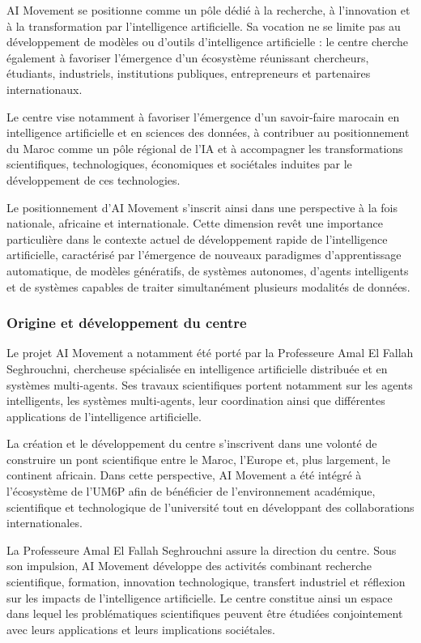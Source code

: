 \documentclass[12pt,a4paper]{report}
\begin{document}
AI Movement se positionne comme un pôle dédié à la recherche, à l'innovation et à la transformation par l'intelligence artificielle. Sa vocation ne se limite pas au développement de modèles ou d'outils d'intelligence artificielle : le centre cherche également à favoriser l'émergence d'un écosystème réunissant chercheurs, étudiants, industriels, institutions publiques, entrepreneurs et partenaires internationaux.

Le centre vise notamment à favoriser l'émergence d'un savoir-faire marocain en intelligence artificielle et en sciences des données, à contribuer au positionnement du Maroc comme un pôle régional de l'IA et à accompagner les transformations scientifiques, technologiques, économiques et sociétales induites par le développement de ces technologies.

Le positionnement d'AI Movement s'inscrit ainsi dans une perspective à la fois nationale, africaine et internationale. Cette dimension revêt une importance particulière dans le contexte actuel de développement rapide de l'intelligence artificielle, caractérisé par l'émergence de nouveaux paradigmes d'apprentissage automatique, de modèles génératifs, de systèmes autonomes, d'agents intelligents et de systèmes capables de traiter simultanément plusieurs modalités de données.

\subsubsection{Origine et développement du centre}

Le projet AI Movement a notamment été porté par la Professeure Amal El Fallah Seghrouchni, chercheuse spécialisée en intelligence artificielle distribuée et en systèmes multi-agents. Ses travaux scientifiques portent notamment sur les agents intelligents, les systèmes multi-agents, leur coordination ainsi que différentes applications de l'intelligence artificielle.

La création et le développement du centre s'inscrivent dans une volonté de construire un pont scientifique entre le Maroc, l'Europe et, plus largement, le continent africain. Dans cette perspective, AI Movement a été intégré à l'écosystème de l'UM6P afin de bénéficier de l'environnement académique, scientifique et technologique de l'université tout en développant des collaborations internationales.

La Professeure Amal El Fallah Seghrouchni assure la direction du centre. Sous son impulsion, AI Movement développe des activités combinant recherche scientifique, formation, innovation technologique, transfert industriel et réflexion sur les impacts de l'intelligence artificielle. Le centre constitue ainsi un espace dans lequel les problématiques scientifiques peuvent être étudiées conjointement avec leurs applications et leurs implications sociétales.
\end{document}
